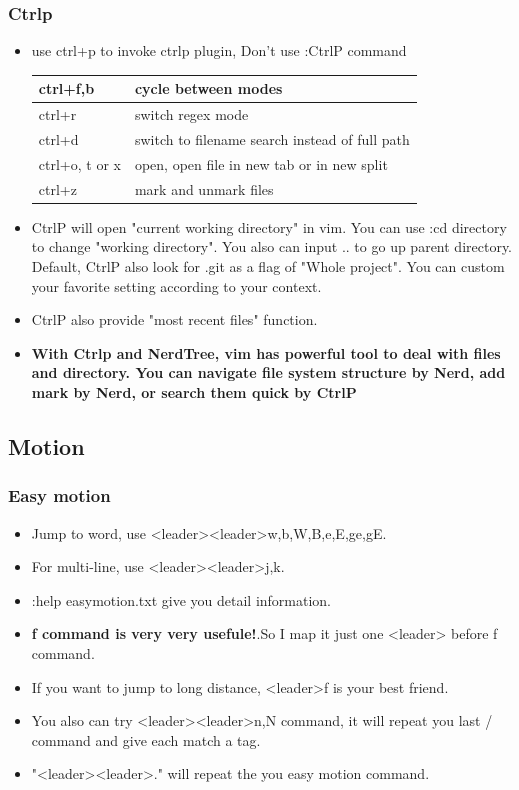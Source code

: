 \documentclass[a4paper,12pt,twoside]{book}
\begin{document}
\subsubsection{Ctrlp}
\begin{itemize}
\item use ctrl+p to invoke ctrlp plugin, Don't use :CtrlP command  \\ 
\begin{tabular}{|p{}|p{}|}
\hline 
ctrl+f,b  & cycle between modes \\ 
\hline 
ctrl+r & switch regex mode  \\ 
\hline 
ctrl+d & switch to filename search instead of full path \\ 
\hline 
ctrl+o, t or x & open, open file in new tab or in new split \\ 
\hline 
ctrl+z  & mark and unmark files \\ 
\hline 
\end{tabular} 
\item CtrlP will open "current working directory" in vim. You can use :cd directory to change "working directory". You also can input .. to go up parent directory. Default, CtrlP also look for .git as a flag of "Whole project". You can custom your favorite setting according to your context.

\item CtrlP also provide "most recent files" function.

\item \textbf{With Ctrlp and NerdTree, vim has powerful tool to deal with files and directory. You can navigate file system structure by Nerd, add mark by Nerd, or search them quick by CtrlP}
\end{itemize}

\subsection{Motion}
\subsubsection{Easy motion}
\begin{itemize}
		\item Jump to word, use <leader><leader>w,b,W,B,e,E,ge,gE. 

		\item For multi-line, use <leader><leader>j,k.  

		\item :help easymotion.txt give you detail information.

		\item \textbf{f command is very very usefule!}.So I map it just one <leader> before f command. 

		\item If you want to jump to long distance, <leader>f is your best friend. 

		\item You also can try <leader><leader>n,N command, it will repeat you last / command and give each match a tag.
		\item "<leader><leader>."  will repeat the you easy motion command. 
\end{itemize}
\end{document}

